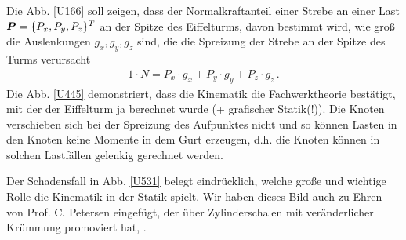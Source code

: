 Die Abb. \ref{U166} soll zeigen, dass der Normalkraftanteil einer Strebe an einer Last $\mbox{\boldmath $P$} = \{P_x, P_y, P_z\}^T$ an der Spitze des Eiffelturms, davon bestimmt wird, wie gro{\ss} die Auslenkungen $g_x, g_y, g_z$ sind, die die Spreizung der Strebe an der Spitze des Turms verursacht
\begin{align}
1 \cdot N = P_x \cdot g_x + P_y \cdot g_y + P_z \cdot g_z\,.
\end{align}
Die Abb. \ref{U445} demonstriert, dass die Kinematik die Fachwerktheorie best\"{a}tigt, mit der der Eiffelturm ja berechnet wurde (+ grafischer Statik(!)). Die Knoten verschieben sich bei der Spreizung des Aufpunktes nicht und so k\"{o}nnen Lasten in den Knoten keine Momente in dem Gurt erzeugen, d.h. die Knoten k\"{o}nnen in solchen Lastf\"{a}llen gelenkig gerechnet werden.

Der Schadensfall in Abb. \ref{U531} belegt eindr\"{u}cklich, welche gro{\ss}e und wichtige Rolle die Kinematik in der Statik spielt. Wir haben dieses Bild auch zu Ehren von Prof. C. Petersen eingef\"{u}gt, der \"{u}ber Zylinderschalen mit ver\"{a}nderlicher Kr\"{u}mmung promoviert hat, \cite{Petersen0}.

